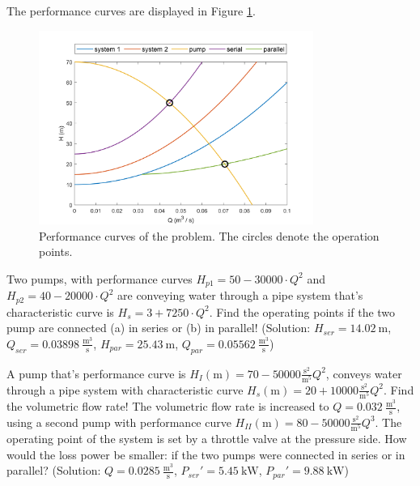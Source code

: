 The performance curves are displayed in Figure \ref{fig_example1}.

\begin{figure}[!htb]
\centering
\includegraphics[width=0.8\textwidth]{figs/problem_5_par_1.png} 
\caption{ Performance curves of the problem. The circles denote the operation points.}
\label{fig_example1}
\end{figure}


\vspace{1cm}

Two pumps, with performance curves $H_{p1} = 50 - 30000\cdot Q^2$ and $H_{p2} =  40 - 20000\cdot Q^2$ are conveying water through a pipe system that's characteristic curve is $H_s = 3 + 7250\cdot Q^2$. Find the operating points if the two pump are connected (a) in series or (b) in parallel! (Solution: $H_{ser} = 14.02~\mathrm{m}$, $Q_{ser} = 0.03898~\frac{\mathrm{m^3}}{\mathrm{s}}$, $H_{par} = 25.43~\mathrm{m}$, $Q_{par} = 0.05562~\frac{\mathrm{m^3}}{\mathrm{s}}$)


\vspace{1cm}

A pump that's performance curve is $H_I (\mathrm{m}) = 70 - 50000 \frac{\mathrm{s^2}}{\mathrm{m^5}} Q^2$, conveys water through a pipe system with characteristic curve $H_s (\mathrm{m}) = 20 + 10000 \frac{\mathrm{s^2}}{\mathrm{m^5}} Q^2$. Find the volumetric flow rate! The volumetric flow rate is increased to $Q=0.032~\frac{\mathrm{m^3}}{\mathrm{s}}$, using a second pump with performance curve $H_{II} (\mathrm{m}) = 80 - 50000 \frac{\mathrm{s^2}}{\mathrm{m^5}} Q^3$. The operating point of the system is set by a throttle valve at the pressure side. How would the loss power be smaller: if the two pumps were connected in series or in parallel? (Solution: $Q=0.0285~\frac{\mathrm{m^3}}{\mathrm{s}}$, $P_{ser}' = 5.45~\mathrm{kW}$, $P_{par}' = 9.88~\mathrm{kW}$)

